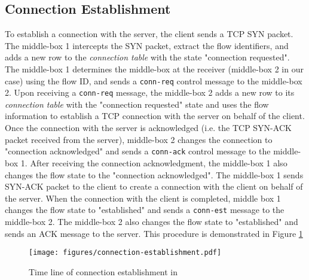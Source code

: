 \subsection{Connection Establishment}
To establish a connection with the server, the client sends a TCP SYN packet.
The middle-box 1 intercepts the SYN packet, extract the flow identifiers, and adds a new row to the \textit{connection table} with the state "connection requested".
The middle-box 1 determines the middle-box at the receiver (middle-box 2 in our case) using the flow ID, and sends a \texttt{conn-req} control message to the middle-box 2.
Upon receiving a \texttt{conn-req} message, the middle-box 2 adds a new row to its \textit{connection table} with the "connection requested" state and uses the flow information to establish a TCP connection with the server on behalf of the client.
Once the connection with the server is acknowledged (i.e. the TCP SYN-ACK packet received from the server), middle-box 2 changes the connection to "connection acknowledged" and sends a \texttt{conn-ack} control message to the middle-box 1.
After receiving the connection acknowledgment, the middle-box 1 also changes the flow state to the "connection acknowledged". 
The middle-box 1 sends SYN-ACK packet to the client to create a connection with the client on behalf of the server.
When the connection with the client is completed, middle box 1 changes the flow state to "established" and sends a \texttt{conn-est} message to the middle-box 2.
The middle-box 2 also changes the flow state to "established" and sends an ACK message to the server.
This procedure is demonstrated in Figure \ref{fig:connection}

\begin{figure}[!htbp]
    \centering
    \texttt{[image: figures/connection-establishment.pdf]}
    \caption{Time line of connection establishment in {\sys}}
    \label{fig:connection}
\end{figure}

